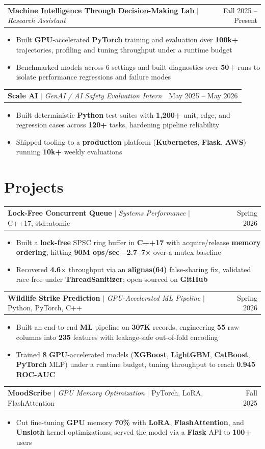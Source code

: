 \documentclass[letterpaper,10pt]{article}
\makeatletter
\newcommand{\resumeWorkHeading}[2]{%
  \vspace{2pt}\noindent
  \begin{tabular*}{\textwidth}{@{}l@{\extracolsep{\fill}}r@{}}
    #1 & #2 \\
  \end{tabular*}%
  \vspace{-2pt}
}
\newcommand{\resumeItemListStart}{\begin{itemize}}
\newcommand{\resumeItemListEnd}{\end{itemize}\vspace{3pt}}
\newcommand{\resumeItem}[1]{\item #1}
\makeatother
\begin{document}
\resumeWorkHeading
{\textbf{Machine Intelligence Through Decision-Making Lab} $|$ \emph{Research Assistant}}{Fall 2025 -- Present}
\resumeItemListStart
\resumeItem{Built \textbf{GPU}-accelerated \textbf{PyTorch} training and evaluation over \textbf{100k+} trajectories, profiling and tuning throughput under a runtime budget}
\resumeItem{Benchmarked models across 6 settings and built diagnostics over \textbf{50+} runs to isolate performance regressions and failure modes}
\resumeItemListEnd

\resumeWorkHeading
{\textbf{Scale AI} $|$ \emph{GenAI / AI Safety Evaluation Intern}}{May 2025 -- May 2026}
\resumeItemListStart
\resumeItem{Built deterministic \textbf{Python} test suites with \textbf{1,200+} unit, edge, and regression cases across \textbf{120+} tasks, hardening pipeline reliability}
\resumeItem{Shipped tooling to a \textbf{production} platform (\textbf{Kubernetes}, \textbf{Flask}, \textbf{AWS}) running \textbf{10k+} weekly evaluations}
\resumeItemListEnd

\section{Projects}
\resumeWorkHeading
{\textbf{Lock-Free Concurrent Queue} $|$ \emph{Systems Performance} $|$ C++17, std::atomic}{Spring 2026}
\resumeItemListStart
\resumeItem{Built a \textbf{lock-free} SPSC ring buffer in \textbf{C++17} with acquire/release \textbf{memory ordering}, hitting \textbf{90M ops/sec}---\textbf{2.7--7$\times$} over a mutex baseline}
\resumeItem{Recovered \textbf{4.6$\times$} throughput via an \textbf{alignas(64)} false-sharing fix, validated race-free under \textbf{ThreadSanitizer}; open-sourced on \textbf{GitHub}}
\resumeItemListEnd

\resumeWorkHeading
{\textbf{Wildlife Strike Prediction} $|$ \emph{GPU-Accelerated ML Pipeline} $|$ Python, PyTorch, C++}{Spring 2026}
\resumeItemListStart
\resumeItem{Built an end-to-end \textbf{ML} pipeline on \textbf{307K} records, engineering \textbf{55} raw columns into \textbf{235} features with leakage-safe out-of-fold encoding}
\resumeItem{Trained \textbf{8} \textbf{GPU}-accelerated models (\textbf{XGBoost}, \textbf{LightGBM}, \textbf{CatBoost}, \textbf{PyTorch} MLP) under a runtime budget, tuning throughput to reach \textbf{0.945 ROC-AUC}}
\resumeItemListEnd

\resumeWorkHeading
{\textbf{MoodScribe} $|$ \emph{GPU Memory Optimization} $|$ PyTorch, LoRA, FlashAttention}{Fall 2025}
\resumeItemListStart
\resumeItem{Cut fine-tuning \textbf{GPU} memory \textbf{70\%} with \textbf{LoRA}, \textbf{FlashAttention}, and \textbf{Unsloth} kernel optimizations; served the model via a \textbf{Flask} API to \textbf{100+} users}
\resumeItemListEnd
\end{document}
